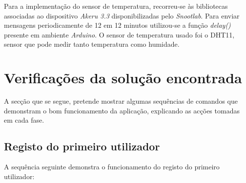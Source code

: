 \documentclass[a4paper]{article}
\begin{document}
Para a implementação do sensor de temperatura, recorreu-se às bibliotecas associadas ao dispositivo \textit{Akeru 3.3} disponibilizadas pelo \textit{Snootlab}. Para enviar mensagens periodicamente de 12 em 12 minutos utilizou-se a função \textit{delay()} presente em ambiente \textit{Arduino}.
O sensor de temperatura usado foi o DHT11, sensor que pode medir tanto temperatura como humidade.

\section{Verificações da solução encontrada}

A secção que se segue, pretende mostrar algumas sequências de comandos que demonstram o bom funcionamento da aplicação, explicando as acções tomadas em cada fase.

\subsection{Registo do primeiro utilizador}

A sequência seguinte demonstra o funcionamento do registo do primeiro utilizador:
\end{document}
